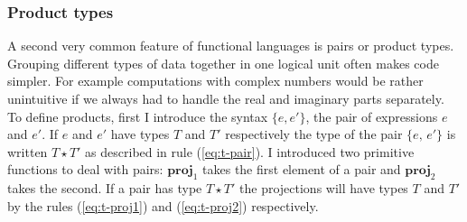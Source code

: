\documentclass[12pt,twoside,notitlepage]{report}
\theoremstyle{plain}%
\theoremstyle{definition}
\theoremstyle{remark}
\begin{document}
\subsubsection{Product types}
A second very common feature of functional languages is pairs or product types. Grouping different types of data together in one logical unit often makes code simpler. For example computations with complex numbers would be rather unintuitive if we always had to handle the real and imaginary parts separately. To define products, first I introduce the syntax $ \{e, e' \} $, the pair of expressions $ e $ and $ e' $. If $ e $ and $ e' $ have types $ T $ and $ T' $ respectively the type of the pair $ \{e,\, e'\} $ is written $ T\star T' $ as described in rule (\ref{eq:t-pair}). I introduced two primitive functions to deal with pairs: $ \textbf{proj}_1 $ takes the first element of a pair and $ \textbf{proj}_2 $ takes the second. If a pair has type  $ T\star T' $ the projections will have types $ T $ and $ T' $ by the rules (\ref{eq:t-proj1}) and (\ref{eq:t-proj2}) respectively.
\end{document}
